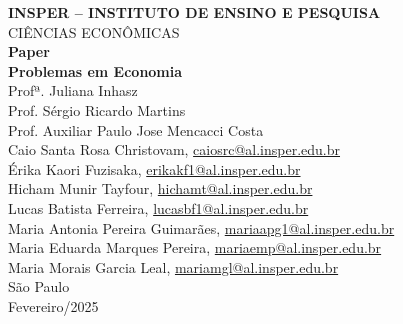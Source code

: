 \documentclass[a4paper,12pt]{article}
\begin{document}
\begin{titlepage}
    \centering
    \vspace*{1cm}
    \Large\textbf{INSPER – INSTITUTO DE ENSINO E PESQUISA}\\
    \Large CIÊNCIAS ECONÔMICAS\\
    \vspace{1.5cm}
    \Large\textbf{Paper}\\
    \textbf{Problemas em Economia}\\
    \vspace{1.5cm}
    Profª. Juliana Inhasz\\
    Prof. Sérgio Ricardo Martins\\
    Prof. Auxiliar Paulo Jose Mencacci Costa\\
    \vfill
    \normalsize
    Caio Santa Rosa Christovam, \href{mailto:caiosrc@al.insper.edu.br}{caiosrc@al.insper.edu.br}\\
    Érika Kaori Fuzisaka, \href{mailto:erikakf1@al.insper.edu.br}{erikakf1@al.insper.edu.br}\\
    Hicham Munir Tayfour, \href{mailto:hichamt@al.insper.edu.br}{hichamt@al.insper.edu.br}\\
    Lucas Batista Ferreira, \href{mailto:lucasbf1@al.insper.edu.br}{lucasbf1@al.insper.edu.br}\\
    Maria Antonia Pereira Guimarães, \href{mailto:mariaapg1@al.insper.edu.br}{mariaapg1@al.insper.edu.br}\\
    Maria Eduarda Marques Pereira, \href{mailto:mariaemp@al.insper.edu.br}{mariaemp@al.insper.edu.br}\\
    Maria Morais Garcia Leal, \href{mailto:mariamgl@al.insper.edu.br}{mariamgl@al.insper.edu.br}\\
    \vfill
    São Paulo\\
    Fevereiro/2025
\end{titlepage}
\end{document}
